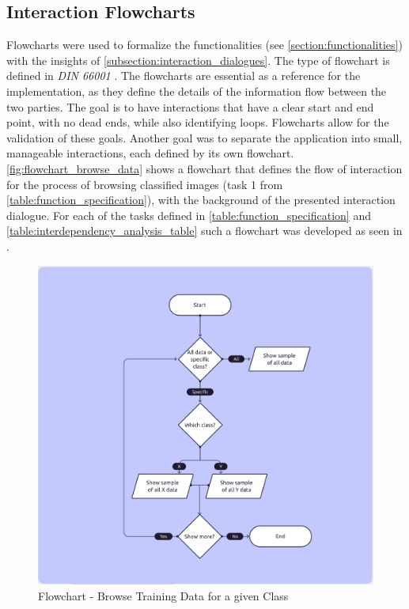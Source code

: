 \documentclass[11pt,a4paper,english]{scrreprt}
\begin{document}
\subsection{Interaction Flowcharts}\label{subsection:interaction_flowcharts}
Flowcharts were used to formalize the functionalities (see \autoref{section:functionalities}) with the insights of \autoref{subsection:interaction_dialogues}. The type of flowchart is defined in \textit{DIN 66001} \parencite{hering_programmablaufplan_1984}. The flowcharts are essential as a reference for the implementation, as they define the details of the information flow between the two parties. The goal is to have interactions that have a clear start and end point, with no dead ends, while also identifying loops. Flowcharts allow for the validation of these goals. Another goal was to separate the application into small, manageable interactions, each defined by its own flowchart. \autoref{fig:flowchart_browse_data} shows a flowchart that defines the flow of interaction for the process of browsing classified images (task 1 from \autoref{table:function_specification}), with the background of the presented interaction dialogue. For each of the tasks defined in \autoref{table:function_specification} and \autoref{table:interdependency_analysis_table} such a flowchart was developed as seen in .
\begin{figure}[htbp]
    \centering
    \includegraphics[width=\textwidth]{img/figures/flowcharts/browse_train_data_for_chosen_class.png}
    \caption{Flowchart - Browse Training Data for a given Class}
    \label{fig:flowchart_browse_data}
\end{figure}
\end{document}
